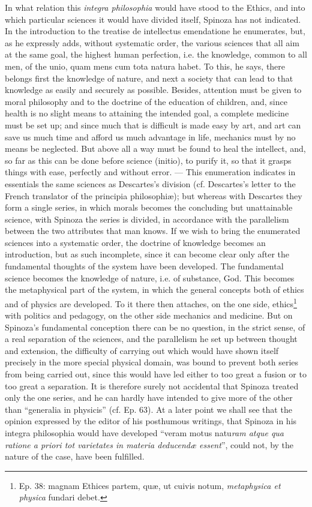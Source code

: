 \documentclass[12pt,a4paper,openany]{book}
\newcommand{\opage}[1]{\marginnote{\footnotesize\textit{[#1]}}}
\begin{document}
In what relation this \emph{integra philosophia} would have stood to the
Ethics, and into which particular sciences it would have divided itself,
Spinoza has not indicated. In the introduction to the treatise de
intellectus emendatione he enumerates, but, as he expressly adds, without
systematic order, the various sciences that all aim at the same goal,
the highest human perfection, i.e. the knowledge, common to all men, of
the unio, quam mens cum tota natura habet. To this, he says, there belongs
first the knowledge of nature, and next a society that can lead to that
knowledge as easily and securely as possible. Besides, attention must be
given to moral philosophy and to the doctrine of the education of
children, and, since health is no slight means to attaining the intended
goal, a complete medicine must be set up; and since much that is
difficult is made easy by art, and art can save us much time and afford
us much advantage in life, mechanics must by no means be neglected. But
above all a way must be found to heal the intellect, and, so far as this
can be done before science (initio), to purify it, so that it grasps
things with ease, perfectly and without error. --- This enumeration
indicates in essentials the same sciences as Descartes's
\opage{42}\setcounter{footnote}{0}division (cf. Descartes's letter to the
French translator of the principia philosophiæ); but whereas with
Descartes they form a single series, in which morals becomes the
concluding but unattainable science, with Spinoza the series is divided,
in accordance with the parallelism between the two attributes that man
knows. If we wish to bring the enumerated sciences into a systematic
order, the doctrine of knowledge becomes an introduction, but as such
incomplete, since it can become clear only after the fundamental
thoughts of the system have been developed. The fundamental science
becomes the knowledge of nature, i.e. of substance, God. This becomes
the metaphysical part of the system, in which the general concepts both
of ethics and of physics are developed. To it there then attaches, on
the one side, ethics\footnote{Ep. 38: magnam Ethices partem, quæ, ut
cuivis notum, \emph{metaphysica et physica} fundari debet.} with
politics and pedagogy, on the other side mechanics and medicine. But on
Spinoza's fundamental conception there can be no question, in the strict
sense, of a real separation of the sciences, and the parallelism he set
up between thought and extension, the difficulty of carrying out which
would have shown itself precisely in the more special physical domain,
was bound to prevent both series from being carried out, since this
would have led either to too great a fusion or to too great a
separation. It is therefore surely not accidental that Spinoza treated
only the one series, and he can hardly have intended to give more of the
other than ``generalia in physicis'' (cf. Ep. 63). At a later point we
shall see that the opinion expressed by the editor of his posthumous
writings, that Spinoza in his integra philosophia would have developed
``veram motus natu\emph{ram atque qua ratione a priori tot varietates
in materia deducendæ essent}'', could not, by the nature of the case,
have been fulfilled.
\end{document}

